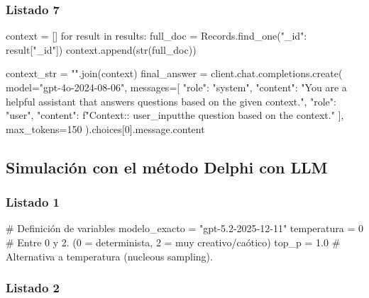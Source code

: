 \subsubsection{Listado 7}
\label{anexo:code-4-4-2-7}

\begin{APACode}
context = []
for result in results:
    full_doc = Records.find_one({"_id": result["_id"]})
    context.append(str(full_doc))

context_str = "\n".join(context)
final_answer = client.chat.completions.create( 
    model="gpt-4o-2024-08-06",
    messages=[
        {"role": "system", "content": "You are a helpful assistant that answers questions based on the given context."},
        {"role": "user", "content": f"Context:\n\nQuestion: {user_input}\n\nAnswer the question based on the context."}
    ],
    max_tokens=150
).choices[0].message.content
\end{APACode}

\subsection{Simulación con el método Delphi con LLM}

\subsubsection{Listado 1}
\label{anexo:code-6-3-1-1-1}

\begin{APACode}
# Definición de variables
modelo_exacto = "gpt-5.2-2025-12-11"  
temperatura = 0         # Entre 0 y 2. (0 = determinista, 2 = muy creativo/caótico)
top_p = 1.0               # Alternativa a temperatura (nucleous sampling). 
\end{APACode}

\subsubsection{Listado 2}
\label{anexo:code-6-3-1-1-2}

